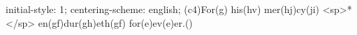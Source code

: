 initial-style: 1;
centering-scheme: english;
(c4)For(g) his(hv) mer(hj)cy(ji) <sp>*</sp> en(gf)dur(gh)eth(gf) for(e)ev(e)er.()
